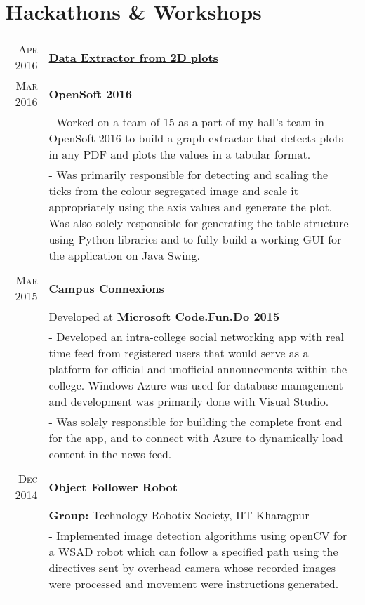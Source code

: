 \documentclass[a4paper,10pt]{extarticle} %
\begin{document}
\section{Hackathons \& Workshops}

\begin{tabular}{r|p{16cm}}

\textsc{Apr 2016} & \textbf{\href{https://github.com/ghostwriternr/Opensoft-2016}{Data Extractor from 2D plots}} \\
\textsc{Mar 2016} & \textbf{OpenSoft 2016}\\
& \footnotesize{- Worked on a team of 15 as a part of my hall's team in OpenSoft 2016 to build a graph extractor that detects plots in any PDF and plots the values in a tabular format.}\\
& \footnotesize{- Was primarily responsible for detecting and scaling the ticks from the colour segregated image and scale it appropriately using the axis values and generate the plot. Was also solely responsible for generating the table structure using Python libraries and to fully build a working GUI for the application on Java Swing.}\\
\multicolumn{2}{c}{} \\

\textsc{Mar 2015} & \textbf{Campus Connexions}\\
& Developed at \textbf{Microsoft Code.Fun.Do 2015}\\
& \footnotesize{- Developed an intra-college social networking app with real time feed from registered users that would serve as a platform for official and unofficial announcements within the college. Windows Azure was used for database management and development was primarily done with Visual Studio.}\\
& \footnotesize{- Was solely responsible for building the complete front end for the app, and to connect with Azure to dynamically load content in the news feed.}\\
\multicolumn{2}{c}{} \\

\textsc{Dec 2014} & \textbf{Object Follower Robot} \\
& \textbf{Group: }\textmd{Technology Robotix Society}, IIT Kharagpur\\
& \footnotesize{- Implemented image detection algorithms using openCV for a WSAD robot which can follow a specified path using the directives sent by overhead camera whose recorded images were processed and movement were instructions generated.}\\
\multicolumn{2}{c}{} \\

\end{tabular}
\end{document}
